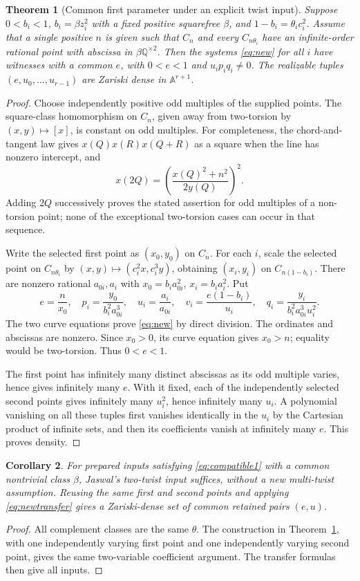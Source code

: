 \documentclass[11pt,a4paper]{article}
\newtheorem{theorem}{Theorem}[section]
\newtheorem{corollary}[theorem]{Corollary}
\theoremstyle{definition}\newtheorem{definition}[theorem]{Definition}
\theoremstyle{remark}\newtheorem{remark}[theorem]{Remark}
\newcommand{\Q}{\mathbb Q}\newcommand{\Z}{\mathbb Z}
\newcommand{\A}{\mathbb A}\newcommand{\sqcl}[1]{[#1]}
\begin{document}
\begin{theorem}[Common first parameter under an explicit twist input]
\label{thm:commone}
Suppose $0<b_i<1$, $b_i=\beta z_i^2$ with a fixed positive squarefree
$\beta$, and $1-b_i=\theta_i c_i^2$.
Assume that a single positive $n$ is given such that $C_n$ and every
$C_{n\theta_i}$ have an infinite-order rational point with abscissa in
$\beta\Q^{\times2}$.
Then the systems \eqref{eq:new} for all $i$ have witnesses with a
\emph{common} $e$, with $0<e<1$ and $u_i p_i q_i\ne0$.
The realizable tuples $(e,u_0,\ldots,u_{r-1})$ are Zariski dense in
$\A^{r+1}$.
\end{theorem}
\begin{proof}
Choose independently positive odd multiples of the supplied points.
The square-class homomorphism on $C_n$, given away from two-torsion by
$(x,y)\mapsto\sqcl x$, is constant on odd multiples. For completeness,
the chord-and-tangent law gives $x(Q)x(R)x(Q+R)$ as a square when the
line has nonzero intercept, and
\[
 x(2Q)=\left(\frac{x(Q)^2+n^2}{2y(Q)}\right)^2.
\]
Adding $2Q$ successively proves the stated assertion for odd multiples
of a non-torsion point; none of the exceptional two-torsion cases can
occur in that sequence.

Write the selected first point as $(x_0,y_0)$ on $C_n$. For each $i$,
scale the selected point on $C_{n\theta_i}$ by $(x,y)\mapsto(c_i^2x,c_i^3y)$,
obtaining $(x_i,y_i)$ on $C_{n(1-b_i)}$. There are nonzero rational
$a_{0i},a_i$ with $x_0=b_i a_{0i}^2$, $x_i=b_i a_i^2$. Put
\[
 e=\frac n{x_0},\quad
 p_i=\frac{y_0}{b_i^2a_{0i}^3},\quad
 u_i=\frac{a_i}{a_{0i}},\quad
 v_i=\frac{e(1-b_i)}{u_i},\quad
 q_i=\frac{y_i}{b_i^2a_{0i}^3u_i^2}.
\]
The two curve equations prove \eqref{eq:new} by direct division.
The ordinates and abscissas are nonzero. Since $x_0>0$, its curve
 equation gives $x_0>n$; equality would be two-torsion. Thus $0<e<1$.

The first point has infinitely many distinct abscissas as its odd
multiple varies, hence gives infinitely many $e$. With it fixed,
each of the independently selected second points gives infinitely many
$u_i^2$, hence infinitely many $u_i$. A polynomial vanishing on all
these tuples first vanishes identically in the $u_i$ by the Cartesian
product of infinite sets, and then its coefficients vanish at infinitely
many $e$. This proves density.
\end{proof}

\begin{corollary}\label{cor:newdensity}
For prepared inputs satisfying \eqref{eq:compatible1} with a common
nontrivial class $\beta$, Jaswal's two-twist input suffices, without a
new multi-twist assumption. Reusing the same first and second points
and applying \eqref{eq:newtransfer} gives a Zariski-dense set of common
retained pairs $(e,u)$.
\end{corollary}
\begin{proof}
All complement classes are the same $\theta$. The construction in
Theorem~\ref{thm:commone}, with one independently varying first point and
one independently varying second point, gives the same two-variable
coefficient argument. The transfer formulas then give all inputs.
\end{proof}
\end{document}
